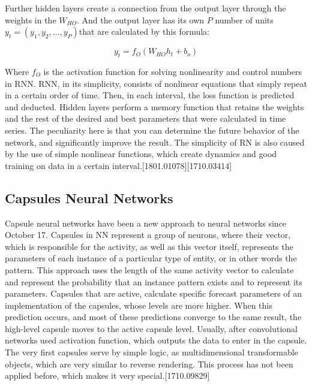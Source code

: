 \noindent Further hidden layers create a connection from the output layer through the weights in the $W_{HO}$. And the output layer has its own $P$ number of units $y_t = (y_1, y_2, ..., y_P)$that are calculated by this formula:

\begin{equation}
	y_t = f_O(W_{HO}h_t + b_o)
\end{equation}

\noindent Where $f_O$ is the activation function for solving nonlinearity and control numbers in RNN. RNN, in its simplicity, consists of nonlinear equations that simply repeat in a certain order of time. Then, in each interval, the loss function is predicted and deducted. Hidden layers perform a memory function that retains the weights and the rest of the desired and best parameters that were calculated in time series. The peculiarity here is that you can determine the future behavior of the network, and significantly improve the result. The simplicity of RN is also caused by the use of simple nonlinear functions, which create dynamics and good training on data in a certain interval.[1801.01078][1710.03414]

\vspace{-0.3cm}

\subsection{Capsules Neural Networks}\label{sec:3.8.3}
\vspace{-0.5cm}
\noindent Capsule neural networks have been a new approach to neural networks since October 17. Capsules in NN represent a group of neurons, where their vector, which is responsible for the activity, as well as this vector itself,  represents the parameters of each instance of a particular type of entity, or in other words the pattern. This approach uses the length of the same activity vector to calculate and represent the probability that an instance pattern exists and to represent its parameters. Capsules that are active, calculate specific forecast parameters of an implementation of the capsules, whose levels are more higher. When this prediction occurs, and most of these predictions converge to the same result, the high-level capsule moves to the active capsule level. Usually, after convolutional networks used activation function, which outputs the data to enter in the capsule. The very first capsules serve by simple logic, as multidimensional transformable objects, which are very similar to reverse rendering. This process has not been applied before, which makes it very special.[1710.09829]



